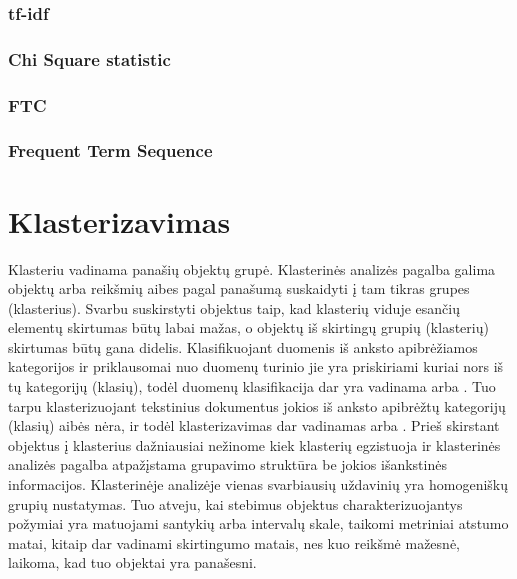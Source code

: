\documentclass{VUMIFInfKursinis}
\begin{document}
		\subsubsection{tf-idf}

		\subsubsection{Chi Square statistic}

		\subsubsection{FTC}

		\subsubsection{Frequent Term Sequence}


\section{Klasterizavimas}
	Klasteriu vadinama panašių objektų grupė. Klasterinės analizės pagalba galima objektų arba reikšmių aibes pagal panašumą suskaidyti į tam tikras grupes (klasterius). Svarbu suskirstyti objektus taip, kad klasterių viduje esančių elementų skirtumas būtų labai mažas, o objektų iš skirtingų grupių (klasterių) skirtumas būtų gana didelis. 
	Klasifikuojant duomenis iš anksto apibrėžiamos kategorijos ir priklausomai nuo duomenų turinio jie yra priskiriami kuriai nors iš tų kategorijų (klasių), todėl duomenų klasifikacija dar yra vadinama  arba . Tuo tarpu klasterizuojant tekstinius dokumentus jokios iš anksto apibrėžtų kategorijų (klasių) aibės nėra, ir todėl klasterizavimas dar vadinamas  arba . Prieš skirstant objektus į klasterius dažniausiai nežinome kiek klasterių egzistuoja ir klasterinės analizės pagalba atpažįstama grupavimo struktūra be jokios išankstinės informacijos. 
	Klasterinėje analizėje vienas svarbiausių uždavinių yra homogeniškų grupių nustatymas. Tuo atveju, kai stebimus objektus charakterizuojantys požymiai yra matuojami santykių arba intervalų skale, taikomi metriniai atstumo matai, kitaip dar vadinami skirtingumo matais, nes kuo reikšmė mažesnė, laikoma, kad tuo objektai yra panašesni.
\end{document}
